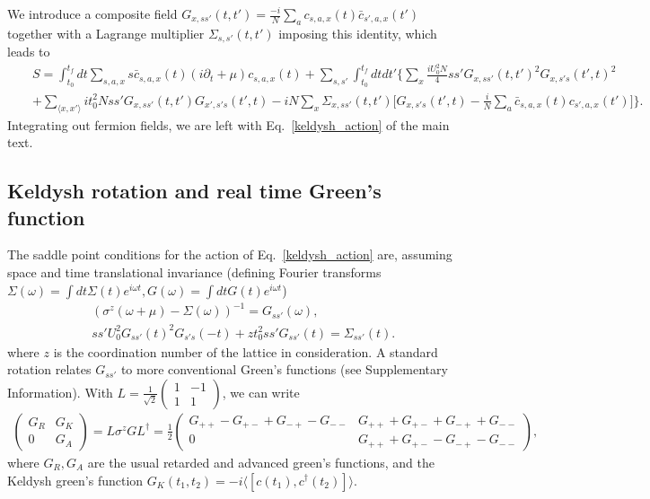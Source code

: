 \documentclass[twocolumn,floatfix,superscriptaddress]{revtex4-1}
\newcommand{\ket}{\rangle}
\newcommand{\bra}{\langle}
\begin{document}
\begin{widetext}
We introduce a composite field $
   G_{x,ss'}(t,t')=\frac{-i}{N}\sum_a  c_{s,a,x}(t) \bar c_{s',a,x}(t')$ together with a Lagrange multiplier $\Sigma _{s,s'}(t,t')$ imposing this identity, which leads to
\begin{eqnarray}
&& S=\int_{t_0}^{t_f} dt \sum_{s,a,x}s\bar c_{s,a,x}(t)(i\partial_t+\mu) c_{s,a,x}(t)+\sum_{s,s'}\int _{t_0}^{t_f} dt dt' \Bigg\{\sum_x\frac{iU_0^2N}{4}ss' G_{x,ss'}(t,t')^2G_{x,s's}(t',t)^2\nonumber\\
&&+ \sum_{\langle x,x'\rangle} it_0^2 N ss' G_{x,ss'}(t,t')G_{x',s's}(t',t)-iN\sum_{x} \Sigma_{x,ss'}(t,t')\Big[G_{x,s's}(t',t)-\frac{i}{N}\sum_a \bar c_{s,a,x}(t) c_{s',a,x}(t')\Big]\Bigg\}.
\end{eqnarray}
Integrating out fermion fields,  we are left with Eq.~\eqref{keldysh_action} of the main text.

\subsection{Keldysh rotation and real time Green's function}
The saddle point conditions for the action of Eq.~\eqref{keldysh_action} are, assuming space and time translational invariance (defining Fourier transforms $\Sigma(\omega)=\int dt\Sigma(t)e^{i\omega t} ,G(\omega)=\int dt G(t)e^{i\omega t} $)
\begin{eqnarray}
\label{SDk}
&&(\sigma^z(\omega+\mu)-\Sigma(\omega))^{-1}=  G_{ss'}(\omega),\nonumber\\
&&ss' U_0^2  G_{ss'}(t)^2 G_{s's}(-t)+zt_0^2ss'  G_{ss'}(t)=\Sigma_{ss'}(t).
\end{eqnarray}
where $z$ is the coordination number of the lattice in consideration. A standard rotation relates $G_{ss'}$ to more conventional Green's functions (see Supplementary Information).  With $L=\frac{1}{\sqrt{2}}\left( \begin{array}{cc}
1 & -1 \\
1 & 1
\end{array} \right)$, we can write
\begin{eqnarray}
\label{keldysh_g}
\left (\begin{array} {cc} G_R & G_K \\ 0 &G_A\end{array} \right )= L \sigma^z  G L^\dagger
=\frac{1}{2} \left(\begin{array} {cc}  G_{++}- G_{+-}+ G_{-+}- G_{--} & G_{++}+ G_{+-}+ G_{-+}+ G_{--} \\ 0 & G_{++}+ G_{+-}- G_{-+}- G_{--}\end{array}\right),
\end{eqnarray}
where $G_R,G_A$ are  the usual retarded and advanced green's functions, and the Keldysh green's function $G_K(t_1,t_2)=-i \bra [c(t_1),c^\dagger(t_2)]\ket$. 


\end{widetext}
\end{document}
